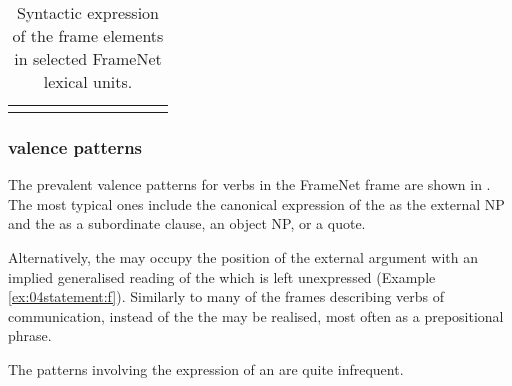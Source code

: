 \documentclass[output=paper,colorlinks,citecolor=brown]{langscibook}
\begin{document}
\begin{table}
\begin{tabular}{l rrrrrrrrr}
\lspbottomrule
 \end{tabular}
 \caption{Syntactic expression of the  frame elements in selected FrameNet lexical units.}
    \label{tbl:statement-synt}
 \end{table}


\subsubsection{ valence patterns}

The prevalent valence patterns for verbs in the FrameNet frame  are shown in . The most typical ones include the canonical expression of the  as the external NP and the  as a subordinate clause, an object NP, or a quote.

Alternatively, the  may occupy the position of the external argument with an implied generalised reading of the  which is left unexpressed (Example \ref{ex:04statement:f}). 
Similarly to many of the frames describing verbs of communication, instead of the  the  may be realised, most often as a prepositional phrase.

The patterns involving the expression of an  are quite infrequent.
\end{document}
